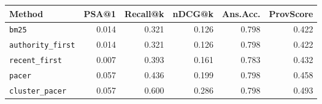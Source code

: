 \begin{tabular}{lrrrrr}
\hline
Method & PSA@1 & Recall@k & nDCG@k & Ans.Acc. & ProvScore \\
\hline
\texttt{bm25} & 0.014 & 0.321 & 0.126 & 0.798 & 0.422 \\
\texttt{authority\_first} & 0.014 & 0.321 & 0.126 & 0.798 & 0.422 \\
\texttt{recent\_first} & 0.007 & 0.393 & 0.161 & 0.783 & 0.432 \\
\texttt{pacer} & 0.057 & 0.436 & 0.199 & 0.798 & 0.458 \\
\texttt{cluster\_pacer} & 0.057 & 0.600 & 0.286 & 0.798 & 0.493 \\
\hline
\end{tabular}

